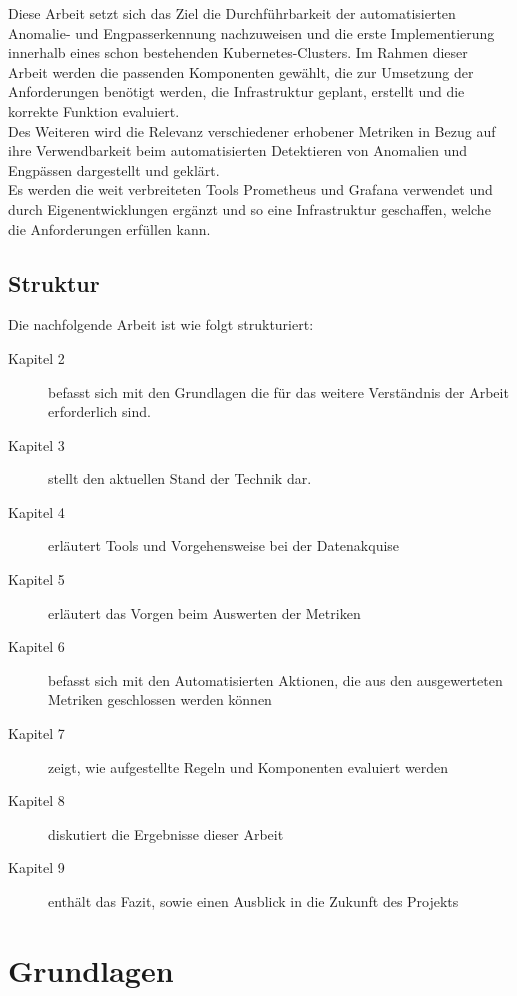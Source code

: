 \documentclass[a4paper,12pt]{scrartcl}
\begin{document}
Diese Arbeit setzt sich das Ziel die Durchführbarkeit der automatisierten Anomalie- und Engpasserkennung nachzuweisen und die erste Implementierung innerhalb eines schon bestehenden Kubernetes-Clusters. 
Im Rahmen dieser Arbeit werden die passenden Komponenten gewählt, die zur Umsetzung der Anforderungen benötigt werden, die Infrastruktur geplant, erstellt und die korrekte Funktion evaluiert.\\
Des Weiteren wird die Relevanz verschiedener erhobener Metriken in Bezug auf ihre Verwendbarkeit beim automatisierten Detektieren von Anomalien und Engpässen dargestellt und geklärt.\\
Es werden die weit verbreiteten Tools Prometheus und Grafana verwendet und durch Eigenentwicklungen ergänzt und so eine Infrastruktur geschaffen, welche die Anforderungen erfüllen kann.

\pagebreak

\subsection{Struktur}

Die nachfolgende Arbeit ist wie folgt strukturiert:\\

\begin{description}

\item [Kapitel 2] befasst sich mit den Grundlagen die für das weitere Verständnis der Arbeit erforderlich sind.
\item [Kapitel 3] stellt den aktuellen Stand der Technik dar.
\item [Kapitel 4] erläutert Tools und Vorgehensweise bei der Datenakquise
\item [Kapitel 5] erläutert das Vorgen beim Auswerten der Metriken
\item [Kapitel 6] befasst sich mit den Automatisierten Aktionen, die aus den ausgewerteten Metriken geschlossen werden können
\item [Kapitel 7] zeigt, wie aufgestellte Regeln und Komponenten evaluiert werden
\item [Kapitel 8] diskutiert die Ergebnisse dieser Arbeit
\item [Kapitel 9] enthält das Fazit, sowie einen Ausblick in die Zukunft des Projekts

\end{description}

\section{Grundlagen}
\end{document}

